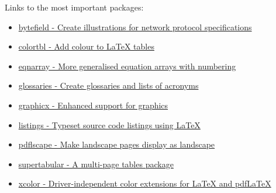 Links to the most important packages:
\begin{itemize}
	\item \href{http://tug.ctan.org/cgi-bin/ctanPackageInformation.py?id=bytefield}{bytefield - Create illustrations for network protocol specifications}
	\item \href{http://tug.ctan.org/cgi-bin/ctanPackageInformation.py?id=colortbl}{colortbl - Add colour to LaTeX tables}
	\item \href{http://tug.ctan.org/cgi-bin/ctanPackageInformation.py?id=eqnarray}{eqnarray - More generalised equation arrays with numbering}
	\item \href{http://tug.ctan.org/cgi-bin/ctanPackageInformation.py?id=glossaries}{glossaries - Create glossaries and lists of acronyms}
	\item \href{http://tug.ctan.org/cgi-bin/ctanPackageInformation.py?id=graphicx}{graphicx - Enhanced support for graphics}
	\item \href{http://tug.ctan.org/cgi-bin/ctanPackageInformation.py?id=listings}{listings - Typeset source code listings using LaTeX}
	\item \href{http://tug.ctan.org/cgi-bin/ctanPackageInformation.py?id=pdflscape}{pdflscape - Make landscape pages display as landscape}
	\item \href{http://tug.ctan.org/cgi-bin/ctanPackageInformation.py?id=supertabular}{supertabular - A multi-page tables package}
	\item \href{http://tug.ctan.org/cgi-bin/ctanPackageInformation.py?id=xcolor}{xcolor - Driver-independent color extensions for LaTeX and pdfLaTeX}
\end{itemize}
